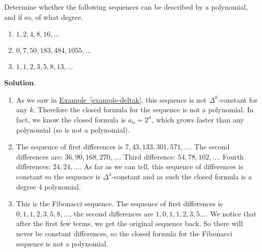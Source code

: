 \documentclass[11pt,]{book}
\theoremstyle{ptxplainnotitle}
\theoremstyle{ptxplaintitle}
\theoremstyle{ptxdefinitionnotitle}
\theoremstyle{ptxdefinitiontitle}
\theoremstyle{ptxdefinitionnotitle}
\theoremstyle{ptxdefinitiontitle}
\theoremstyle{ptxdefinitionnotitle}
\theoremstyle{ptxdefinitiontitle}
\theoremstyle{ptxdefinitiontitlenonumber}
\theoremstyle{ptxdefinitiontitlenonumber}
\numberwithin{equation}{chapter}
\begin{document}
\begin{example}\label{example-17}
\hypertarget{p-364}{}%
Determine whether the following sequences can be described by a polynomial, and if so, of what degree. \leavevmode%
\begin{enumerate}
\item\hypertarget{li-204}{}\(1, 2, 4, 8, 16, \ldots\)%
\item\hypertarget{li-205}{}\(0, 7, 50, 183, 484, 1055, \ldots\)%
\item\hypertarget{li-206}{}\(1,1,2,3,5,8,13,\ldots\)%
\end{enumerate}
%
\par\smallskip%
\noindent\textbf{Solution}.\hypertarget{solution-44}{}\quad%
\hypertarget{p-365}{}%
\leavevmode%
\begin{enumerate}
\item\hypertarget{li-207}{}\hypertarget{p-366}{}%
As we saw in \hyperref[example-deltak]{Example~\ref{example-deltak}}, this sequence is not \(\Delta^k\)-constant for any \(k\). Therefore the closed formula for the sequence is not a polynomial. In fact, we know the closed formula is \(a_n = 2^n\), which grows faster than any polynomial (so is not a polynomial).%
\item\hypertarget{li-208}{}\hypertarget{p-367}{}%
The sequence of first differences is \(7, 43, 133, 301, 571,\ldots\). The second differences are: \(36, 90, 168, 270,\ldots\). Third difference: \(54, 78, 102,\ldots\). Fourth differences: \(24, 24, \ldots\). As far as we can tell, this sequence of differences is constant so the sequence is \(\Delta^4\)-constant and as such the closed formula is a degree 4 polynomial.%
\item\hypertarget{li-209}{}\hypertarget{p-368}{}%
This is the Fibonacci sequence. The sequence of first differences is \(0, 1, 1, 2, 3, 5, 8, \ldots\), the second differences are \(1, 0, 1, 1, 2, 3, 5\ldots\). We notice that after the first few terms, we get the original sequence back. So there will never be constant differences, so the closed formula for the Fibonacci sequence is not a polynomial.%
\end{enumerate}
%
\end{example}
\typeout{************************************************}
\typeout{************************************************}
\end{document}

